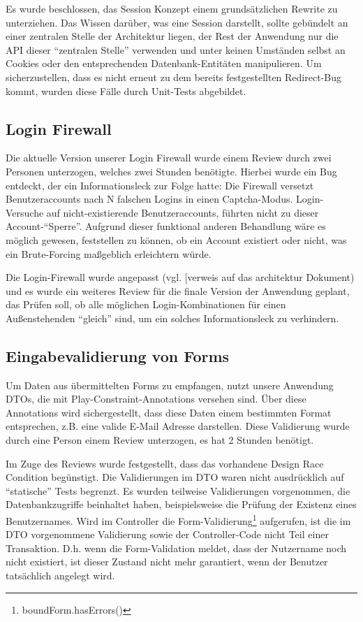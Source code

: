 \documentclass[12pt,DIV14,BCOR10mm,a4paper,parskip=half-,headsepline,headinclude,english,ngerman,bibliography=totocnumbered]{scrreprt}
\begin{document}
Es wurde beschlossen, das Session Konzept einem grundsätzlichen Rewrite zu unterziehen. Das Wissen darüber, was eine Session darstellt, sollte gebündelt an einer zentralen Stelle der Architektur liegen, der Rest der Anwendung nur die API dieser \enquote{zentralen Stelle} verwenden und unter keinen Umständen selbst an Cookies oder den entsprechenden Datenbank-Entitäten manipulieren. Um sicherzustellen, dass es nicht erneut zu dem bereits festgestellten Redirect-Bug kommt, wurden diese Fälle durch Unit-Tests abgebildet.

\subsection{Login Firewall}
Die aktuelle Version unserer Login Firewall wurde einem Review durch zwei Personen unterzogen, welches zwei Stunden benötigte. Hierbei wurde ein Bug entdeckt, der ein Informationsleck zur Folge hatte: Die Firewall versetzt Benutzeraccounts nach N falschen Logins in einen Captcha-Modus. Login-Versuche auf nicht-existierende Benutzeraccounts, führten nicht zu dieser Account-\enquote{Sperre}. Aufgrund dieser funktional anderen Behandlung wäre es möglich gewesen, feststellen zu können, ob ein Account existiert oder nicht, was ein Brute-Forcing maßgeblich erleichtern würde.

Die Login-Firewall wurde angepasst (vgl. [verweis auf das architektur Dokument) und es wurde ein weiteres Review für die finale Version der Anwendung geplant, das Prüfen soll, ob alle möglichen Login-Kombinationen für einen Außenstehenden \enquote{gleich} sind, um ein solches Informationsleck zu verhindern.

\subsection{Eingabevalidierung von Forms}
Um Daten aus übermittelten Forms zu empfangen, nutzt unsere Anwendung DTOs, die mit Play-Constraint-Annotations versehen sind. Über diese Annotations wird sichergestellt, dass diese Daten einem bestimmten Format entsprechen, z.B. eine valide E-Mail Adresse darstellen. Diese Validierung wurde durch eine Person einem Review unterzogen, es hat 2 Stunden benötigt.

Im Zuge des Reviews wurde festgestellt, dass das vorhandene Design Race Condition begünstigt. Die Validierungen im DTO waren nicht ausdrücklich auf \enquote{statische} Tests begrenzt. Es wurden teilweise Validierungen vorgenommen, die Datenbankzugriffe beinhaltet haben, beispielsweise die Prüfung der Existenz eines Benutzernames. Wird im Controller die Form-Validierung\footnote{boundForm.hasErrors()} aufgerufen, ist die im DTO vorgenommene Validierung sowie der Controller-Code nicht Teil einer Transaktion. D.h. wenn die Form-Validation meldet, dass der Nutzername noch nicht existiert, ist dieser Zustand nicht mehr garantiert, wenn der Benutzer tatsächlich angelegt wird.
\end{document}
